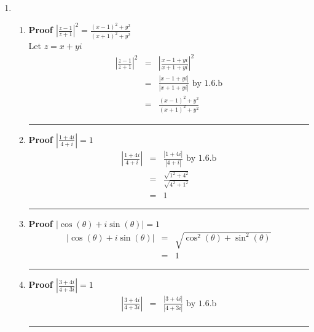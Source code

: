 \documentclass{article}%
\newcommand\abs[1]{\left|#1\right|}
\newenvironment{proof}[1][]{\begin{samepage}\textbf{Proof #1} }{\rule{0.5em}{0.5em} \end{samepage}}
\begin{document}
\begin{enumerate}
\begin{enumerate}[label*=\arabic*.]
\begin{enumerate}[label=\alph*]
        \end{enumerate}
        \item %
        \begin{enumerate}[label=\alph*]
            \item %
            \begin{proof}[$\abs{\frac{z-1}{z+1}}^2=\frac{(x-1)^2+y^2}{(x+1)^2+y^2}$]
                \\ Let $z=x+yi$
                \begin{eqnarray*}
                    \abs{\frac{z-1}{z+1}}^2&=&\abs{\frac{x-1+yi}{x+1+yi}}^2 \\
                                           &=&\frac{\abs{x-1+yi}}{\abs{x+1+yi}} \text{ by 1.6.b} \\
                                           &=&\frac{(x-1)^2+y^2}{(x+1)^2+y^2}
                \end{eqnarray*}
            \end{proof}
            \item %
            \begin{proof}[$\abs{\frac{1+4i}{4+i}}=1$]
                \begin{eqnarray*}
                    \abs{\frac{1+4i}{4+i}}&=&\frac{\abs{1+4i}}{\abs{4+i}} \text{ by 1.6.b} \\
                                          &=&\frac{\sqrt{1^2+4^2}}{\sqrt{4^2+1^2}} \\
                                          &=&1
                \end{eqnarray*}
            \end{proof}
            \item %
            \begin{proof}[$\abs{\cos(\theta)+i \sin(\theta)}=1$]
                \begin{eqnarray*}
                    \abs{\cos(\theta)+i \sin(\theta)}&=&\sqrt{\cos^2(\theta)+\sin^2(\theta)} \\
                                                     &=&1
                \end{eqnarray*}
            \end{proof}
            \item %
            \begin{proof}[$\abs{\frac{3+4i}{4+3i}}=1$]
                \begin{eqnarray*}
                    \abs{\frac{3+4i}{4+3i}}&=&\frac{\abs{3+4i}}{\abs{4+3i}} \text{ by 1.6.b} \\

\end{eqnarray*}
\end{proof}
\end{enumerate}
\end{enumerate}
\end{enumerate}
\end{document}
